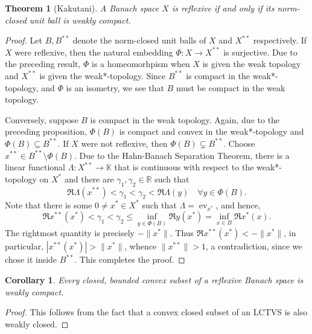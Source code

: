 \documentclass[11pt]{article}
\theoremstyle{thmstyle}
\newtheorem{theorem}{Theorem}[section]
\theoremstyle{defstyle}
\newtheorem*{corollary}{Corollary}
\newcommand{\R}{\mathbb{R}}
\newcommand{\bbC}{\mathbb{C}}
\newcommand{\K}{\mathbb{K}} %
\newcommand{\ev}{\operatorname{ev}}
\renewcommand{\le}{\leqslant}
\begin{document}
\begin{theorem}[Kakutani]
    A Banach space $X$ is reflexive if and only if its norm-closed unit ball is weakly compact.
\end{theorem}
\begin{proof}
    Let $B, B^{\ast\ast}$ denote the norm-closed unit balls of $X$ and $X^{\ast\ast}$ respectively. If $X$ were reflexive, then the natural embedding $\Phi:X\to X^{\ast\ast}$ is surjective. Due to the preceding result, $\Phi$ is a homeomorhpism when $X$ is given the weak topology and $X^{\ast\ast}$ is given the weak*-topology. Since $B^{\ast\ast}$ is compact in the weak*-topology, and $\Phi$ is an isometry, we see that $B$ must be compact in the weak topology.

    Conversely, suppose $B$ is compact in the weak topology. Again, due to the preceding proposition, $\Phi(B)$ is compact and convex in the weak*-topology and $\Phi(B)\subseteq B^{\ast\ast}$. If $X$ were not reflexive, then $\Phi(B)\subsetneq B^{\ast\ast}$. Choose $x^{\ast\ast}\in B^{\ast\ast}\setminus\Phi(B)$. Due to the Hahn-Banach Separation Theorem, there is a linear functional $\Lambda: X^{\ast\ast}\to\K$ that is continuous with respect to the weak*-topology on $X^\ast$ and there are $\gamma_1,\gamma_2\in\R$ such that 
    \begin{equation*}
        \Re\Lambda(x^{\ast\ast}) < \gamma_1 < \gamma_2 < \Re\Lambda(y)\quad\forall y\in \Phi(B).
    \end{equation*}
    Note that there is some $0\ne x^\ast\in X^\ast$ such that $\Lambda = \ev_{x^\ast}$, and hence, 
    \begin{equation*}
        \Re x^{\ast\ast}(x^\ast) < \gamma_1 < \gamma_2\le\inf_{y\in\Phi(B)}\Re y(x^\ast) = \inf_{x\in B} \Re x^\ast(x).
    \end{equation*}
    The rightmost quantity is precisely $-\|x^\ast\|$. Thus $\Re x^{\ast\ast}(x^\ast) < -\|x^\ast\|$, in particular, $|x^{\ast\ast}(x^\ast)| > \|x^\ast\|$, whence $\|x^{\ast\ast}\| > 1$, a contradiction, since we chose it inside $B^{\ast\ast}$. This completes the proof.
\end{proof}

\begin{corollary}
    Every closed, bounded convex subset of a reflexive Banach space is weakly compact.
\end{corollary}
\begin{proof}
    This follows from the fact that a convex closed subset of an LCTVS is also weakly closed.
\end{proof}
\end{document}
